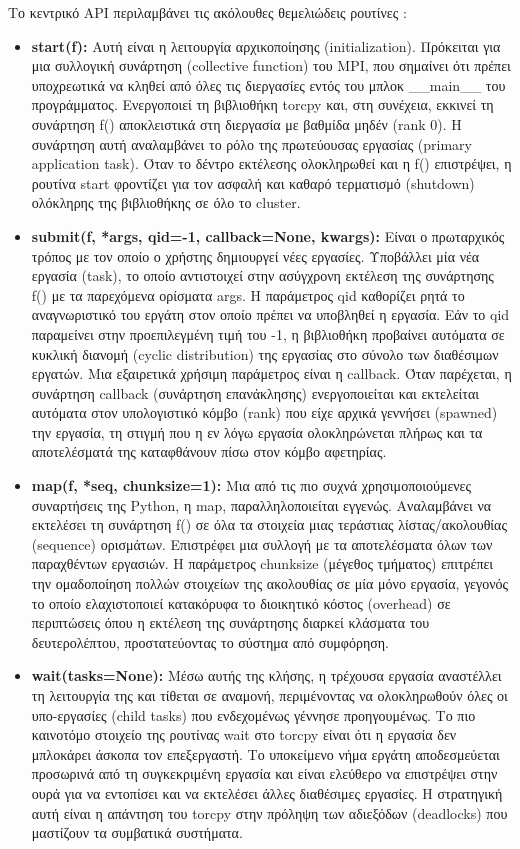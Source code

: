 Το κεντρικό API περιλαμβάνει τις ακόλουθες θεμελιώδεις ρουτίνες \cite{hadjidoukas2020torcpy}:

\begin{itemize}
    \item \textbf{start(f):}  Αυτή είναι η λειτουργία αρχικοποίησης (initialization). Πρόκειται για μια συλλογική συνάρτηση (collective function) του MPI, που σημαίνει ότι πρέπει υποχρεωτικά να κληθεί από όλες τις διεργασίες εντός του μπλοκ \_\_main\_\_ του προγράμματος. Ενεργοποιεί τη βιβλιοθήκη torcpy και, στη συνέχεια, εκκινεί τη συνάρτηση f() αποκλειστικά στη διεργασία με βαθμίδα μηδέν (rank 0). Η συνάρτηση αυτή αναλαμβάνει το ρόλο της πρωτεύουσας εργασίας (primary application task). Όταν το δέντρο εκτέλεσης ολοκληρωθεί και η f() επιστρέψει, η ρουτίνα start φροντίζει για τον ασφαλή και καθαρό τερματισμό (shutdown) ολόκληρης της βιβλιοθήκης σε όλο το cluster.
    \item \textbf{submit(f, *args, qid=-1, callback=None, kwargs):} Είναι ο πρωταρχικός τρόπος με τον οποίο ο χρήστης δημιουργεί νέες εργασίες. Υποβάλλει μία νέα εργασία (task), το οποίο αντιστοιχεί στην ασύγχρονη εκτέλεση της συνάρτησης f() με τα παρεχόμενα ορίσματα args. Η παράμετρος qid καθορίζει ρητά το αναγνωριστικό του εργάτη στον οποίο πρέπει να υποβληθεί η εργασία. Εάν το qid παραμείνει στην προεπιλεγμένη τιμή του -1, η βιβλιοθήκη προβαίνει αυτόματα σε κυκλική διανομή (cyclic distribution) της εργασίας στο σύνολο των διαθέσιμων εργατών. Μια εξαιρετικά χρήσιμη παράμετρος είναι η callback. Όταν παρέχεται, η συνάρτηση callback (συνάρτηση επανάκλησης) ενεργοποιείται και εκτελείται αυτόματα στον υπολογιστικό κόμβο (rank) που είχε αρχικά γεννήσει (spawned) την εργασία, τη στιγμή που η εν λόγω εργασία ολοκληρώνεται πλήρως και τα αποτελέσματά της καταφθάνουν πίσω στον κόμβο αφετηρίας. 
    \item \textbf{map(f, *seq, chunksize=1):} Μια από τις πιο συχνά χρησιμοποιούμενες συναρτήσεις της Python, η map, παραλληλοποιείται εγγενώς. Αναλαμβάνει να εκτελέσει τη συνάρτηση f() σε όλα τα στοιχεία μιας τεράστιας λίστας/ακολουθίας (sequence) ορισμάτων. Επιστρέφει μια συλλογή με τα αποτελέσματα όλων των παραχθέντων εργασιών. Η παράμετρος chunksize (μέγεθος τμήματος) επιτρέπει την ομαδοποίηση πολλών στοιχείων της ακολουθίας σε μία μόνο εργασία, γεγονός το οποίο ελαχιστοποιεί κατακόρυφα το διοικητικό κόστος (overhead) σε περιπτώσεις όπου η εκτέλεση της συνάρτησης διαρκεί κλάσματα του δευτερολέπτου, προστατεύοντας το σύστημα από συμφόρηση.
    \item \textbf{wait(tasks=None):} Μέσω αυτής της κλήσης, η τρέχουσα εργασία αναστέλλει τη λειτουργία της και τίθεται σε αναμονή, περιμένοντας να ολοκληρωθούν όλες οι υπο-εργασίες (child tasks) που ενδεχομένως γέννησε προηγουμένως. Το πιο καινοτόμο στοιχείο της ρουτίνας wait στο torcpy είναι ότι η εργασία δεν μπλοκάρει άσκοπα τον επεξεργαστή. Το υποκείμενο νήμα εργάτη αποδεσμεύεται προσωρινά από τη συγκεκριμένη εργασία και είναι ελεύθερο να επιστρέψει στην ουρά για να εντοπίσει και να εκτελέσει άλλες διαθέσιμες εργασίες. Η στρατηγική αυτή είναι η απάντηση του torcpy στην πρόληψη των αδιεξόδων (deadlocks) που μαστίζουν τα συμβατικά συστήματα.
\end{itemize}

